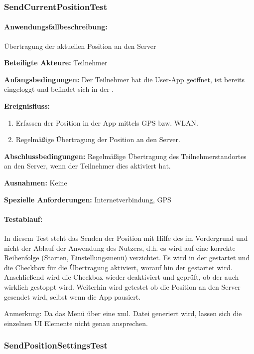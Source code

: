 \subsubsection{SendCurrentPositionTest}
\paragraph{Anwendungsfallbeschreibung:} Übertragung der aktuellen Position an den Server

\textbf{Beteiligte Akteure:}
	Teilnehmer
	
\textbf{Anfangsbedingungen:}
	Der Teilnehmer hat die User-App geöffnet, ist bereits eingeloggt und befindet sich in der .
	
\textbf{Ereignisfluss:}
	\begin{enumerate}
		\item Erfassen der Position in der App mittels GPS bzw. WLAN.
		\item Regelmäßige Übertragung der Position an den Server.
	\end{enumerate}
	
\textbf{Abschlussbedingungen:}
	Regelmäßige Übertragung des Teilnehmerstandortes an den Server, wenn der Teilnehmer dies aktiviert hat.
	
\textbf{Ausnahmen:}
	Keine
	
\textbf{Spezielle Anforderungen:}
	Internetverbindung, GPS

\paragraph{Testablauf:}
In diesem Test steht das Senden der Position mit Hilfe des  im Vordergrund und nicht der Ablauf der Anwendung des Nutzers, d.h. es wird auf eine korrekte Reihenfolge (Starten, Einstellungsmenü) verzichtet.
Es wird in der  gestartet und die Checkbox für die Übertragung aktiviert, worauf hin der  gestartet wird. Anschließend wird die Checkbox wieder deaktiviert und geprüft, ob der   auch wirklich gestoppt wird. Weiterhin wird getestet ob die Position an den Server gesendet wird, selbst wenn die App pausiert.

Anmerkung: Da das Menü über eine xml. Datei generiert wird, lassen sich die einzelnen UI Elemente nicht genau ansprechen.



\subsubsection{SendPositionSettingsTest}
